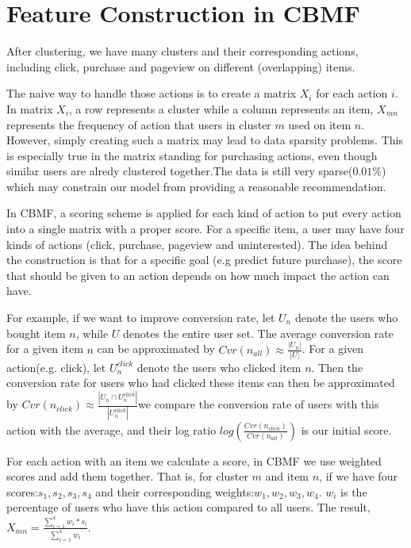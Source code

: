 \section{Feature Construction in CBMF}

After clustering, we have many clusters and their corresponding actions, including click, purchase and pageview on different (overlapping) items.

The naive way to handle those actions is to create a matrix $X_i$ for each action $i$. In matrix $X_i$, a row represents a cluster while a column represents an item, $X_{mn}$ represents the frequency of action that users in cluster $m$ used on item $n$. However, simply creating such a matrix may lead to data sparsity problems. This is especially true in the matrix standing for purchasing actions, even though similar users are alredy clustered together.The data is still very sparse($0.01\%$) which may constrain our model from providing a reasonable recommendation.

In CBMF, a scoring scheme is applied for each kind of action to put every action into a single matrix with a proper score. For a specific item, a user may have four kinds of actions (click, purchase, pageview and uninterested). The idea behind the construction is that for a specific goal (e.g predict future purchase), the score that should be given to an action depends on how much impact the action can have.

For example, if we want to improve conversion rate, let $U_n$ denote the users who bought item $n$, while $U$ denotes the entire user set. The average conversion rate for a given item $n$ can be approximated by $Cvr(n_{all}) \approx \frac{|U_n|}{|U|}$. 
For a given action(e.g. click), let $U_n^{click}$ denote the users who clicked item $n$. Then the conversion rate for users who had clicked these items can then be approximated by $Cvr(n_{click}) \approx \frac{|U_n \cap U_n^{click}|}{|U_n^{click}|}$we compare the conversion rate of users with this action with the average, and their log ratio $log(\frac{Cvr(n_{click})}{Cvr(n_{all})})$ is our initial score.

For each action with an item we calculate a score, in CBMF we use weighted scores and add them together. That is, for cluster $m$ and item $n$, if we have four scores:$s_1, s_2, s_3, s_4$ and their corresponding weights:$w_1, w_2, w_3, w_4$. $w_i$ is the percentage of users who have this action compared to all users. The result, $X_{mn} = \frac{\sum_{i=1}^4 w_i*s_i}{\sum_{i=1}^4 w_i}$. 

